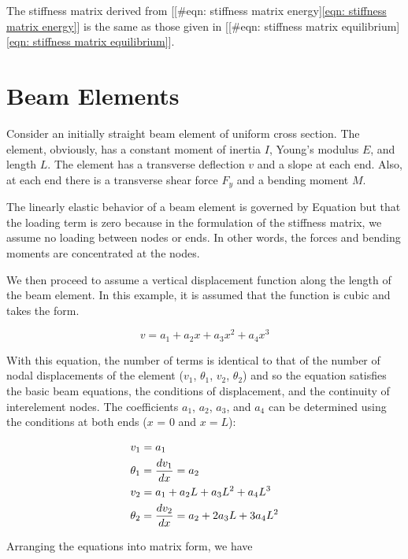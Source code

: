\documentclass[a4paper,openany,12pt]{book}
\begin{document}
{{The stiffness matrix derived from [[\#eqn: stiffness matrix energy]\ref{eqn: stiffness matrix energy}] is the same as those given in [[\#eqn: stiffness matrix equilibrium]\ref{eqn: stiffness matrix equilibrium}].

\section{Beam Elements}
\label{beam-elements}
Consider an initially straight beam element of uniform cross section.
The element, obviously, has a constant moment of inertia \(I\), Young's
modulus \(E\), and length \(L\). The element has a transverse deflection \(v\)
and a slope at each end. Also, at each end there is a transverse shear
force \(F_y\) and a bending moment \(M\).

The linearly elastic behavior of a beam element is governed by Equation
but that the loading term is zero because in the formulation of the
stiffness matrix, we assume no loading between nodes or ends. In other
words, the forces and bending moments are concentrated at the nodes.

We then proceed to assume a vertical displacement function along the
length of the beam element. In this example, it is assumed that the
function is cubic and takes the form.

$$ v = a_1 + a_2x + a_3x^2 + a_4x^3$$

With this equation, the number of terms is identical to that of the
number of nodal displacements of the element (\(v_1\), \(\theta_1\), \(v_2\),
\(\theta_2\)) and so the equation satisfies the basic beam equations, the
conditions of displacement, and the continuity of interelement nodes.
The coefficients \(a_1\), \(a_2\), \(a_3\), and \(a_4\) can be determined using
the conditions at both ends (\(x\) = 0 and \(x = L\)):

\begin{gather*}
  v_1 = a_1 \hfill \\
  \theta _1 = \frac{dv_1}{dx} = a_2 \hfill \\
  v_2 = a_1 + a_2L + a_3L^2 + a_4L^3 \hfill \\
  \theta_2 = \frac{dv_2}{dx} = a_2 + 2a_3L + 3a_4L^2 \hfill \\ 
\end{gather*}

Arranging the equations into matrix form, we have

}}
\end{document}
